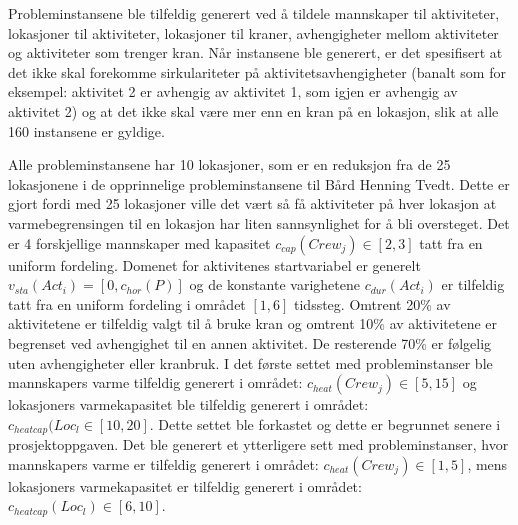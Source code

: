 Probleminstansene ble tilfeldig generert ved å tildele mannskaper til aktiviteter, lokasjoner til aktiviteter, lokasjoner til kraner, avhengigheter mellom aktiviteter og aktiviteter som trenger kran. Når instansene ble generert, er det spesifisert at det ikke skal forekomme sirkulariteter på aktivitetsavhengigheter (banalt som for eksempel: aktivitet 2 er avhengig av aktivitet 1, som igjen er avhengig av aktivitet 2) og at det ikke skal være mer enn en kran på en lokasjon, slik at alle 160 instansene er gyldige.

Alle probleminstansene har 10 lokasjoner, som er en reduksjon fra de 25 lokasjonene i de opprinnelige probleminstansene til Bård Henning Tvedt. Dette er gjort fordi med 25 lokasjoner ville det vært så få aktiviteter på hver lokasjon at varmebegrensingen til en lokasjon har liten sannsynlighet for å bli oversteget. Det er 4 forskjellige mannskaper med kapasitet $ c_{cap}(Crew_{j}) \in [2,3] $ tatt fra en uniform fordeling. Domenet for aktivitenes startvariabel er generelt $ v_{sta}(Act_{i}) = [0,c_{hor}(P)] $ og de konstante varighetene $ c_{dur}(Act_{i}) $ er tilfeldig tatt fra en uniform fordeling i området $ [1,6] $ tidssteg. Omtrent 20\% av aktivitetene er tilfeldig valgt til å bruke kran og omtrent 10\% av aktivitetene er begrenset ved avhengighet til en annen aktivitet. De resterende 70\% er følgelig uten avhengigheter eller kranbruk. I det første settet med probleminstanser ble mannskapers varme tilfeldig generert i området: $c_{heat}(Crew_{j}) \in [5,15]$ og lokasjoners varmekapasitet ble tilfeldig generert i området: $c_{heatcap}(Loc_{l} \in [10,20]$. Dette settet ble forkastet og dette er begrunnet senere i prosjektoppgaven. Det ble generert et ytterligere sett med probleminstanser, hvor mannskapers varme er tilfeldig generert i området: $c_{heat}(Crew_{j}) \in [1,5]$, mens lokasjoners varmekapasitet er tilfeldig generert i området: $c_{heatcap}(Loc_{l}) \in [6,10]$.